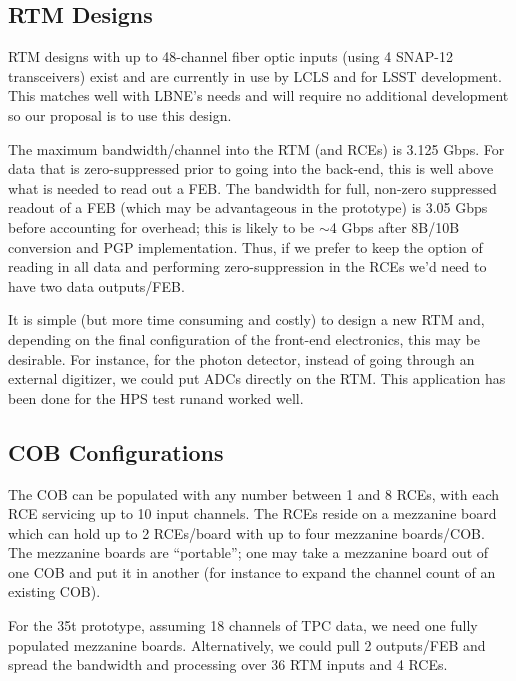 \subsection{RTM Designs}

RTM designs with up to 48-channel fiber optic inputs (using 4 SNAP-12 transceivers) exist and are currently in use by LCLS and for LSST development. This matches well with LBNE's needs and will require no additional development so our proposal is to use this design.  

The maximum bandwidth/channel into the RTM (and RCEs) is 3.125 Gbps.  For data that is zero-suppressed prior to going into the back-end, this is well above what is needed to read out a FEB.    The bandwidth for full, non-zero suppressed readout of a FEB (which may be advantageous in the prototype) is 3.05 Gbps before accounting for overhead;  this is likely to be $\sim$4 Gbps after 8B/10B conversion and PGP implementation.  Thus, if we prefer to keep the option of reading in all data and performing zero-suppression in the RCEs we'd need to have two data outputs/FEB.   

It is simple (but more time consuming and costly) to design a new RTM and, depending on the final configuration of the front-end electronics, this may be desirable.  For instance, for the photon detector, instead of going through an external digitizer, we could put ADCs directly on the RTM.  This application has been done for the HPS test runand worked well.  


\subsection{COB Configurations}

The COB can be populated with any number between 1 and 8 RCEs, with each RCE servicing up to 10 input channels.  The RCEs reside on a mezzanine board which can hold up to 2 RCEs/board with up to four mezzanine boards/COB.  The mezzanine boards are ``portable''; one may take a mezzanine board out of one COB and put it in another (for instance to expand the channel count of an existing COB).  

For the 35t prototype, assuming 18 channels of TPC data, we need one fully populated mezzanine boards.  Alternatively, we could pull 2 outputs/FEB and spread the bandwidth and processing over 36 RTM inputs and 4 RCEs. 


